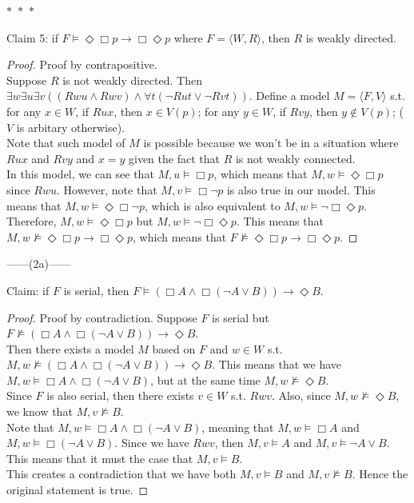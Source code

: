 \documentclass[12pt]{article}
\newcommand{\B}{\Box}
\newcommand{\D}{\Diamond}
\newcommand{\s}{\vDash}
\newcommand{\ns}{\nvDash}
\begin{document}
\noindent
\begin{center}
    $\ast$~$\ast$~$\ast$
\end{center}
Claim 5: if $F \vDash \D \B p \to \B \D p$ where $F = \langle W, R \rangle$, then $R$ is weakly directed. 
\begin{proof} Proof by contrapositive.\\
    Suppose $R$ is not weakly directed.
    Then $\exists w \exists u \exists v ((Rwu \land Rwv) \land \forall t(\neg Rut \lor \neg Rvt))$.
    Define a model $M  = \langle F, V \rangle$ s.t. for any $x \in W$, if $Rux$, then $x \in V(p)$; for any $y \in W$, if $Rvy$, then $y \notin V(p)$; ($V$ is arbitary otherwise).\\
    Note that such model of $M$ is possible because we won't be in a situation where $Rux$ and $Rvy$ and $x = y$ given the fact that $R$ is not weakly connected.\\
    In this model, we can see that $M, u \s \B p$, which means that $M, w \s \D \B p$ since $Rwu$.
    However, note that $M, v \s \B \neg p$ is also true in our model. 
    This means that $M, w \s \D \B \neg p$, which is also equivalent to $M, w \s \neg \B \D p$.\\
    Therefore, $M, w \s \D \B p$ but $M, w \s \neg \B \D p$.
    This means that $M, w \ns \D \B p \to \B \D p$, which means that $F \ns \D \B p \to \B \D p$.

\end{proof}

\newpage
\noindent
\begin{center}
    ------(2a)------
\end{center}
Claim: if $F$ is serial, then $F \s (\B A \land \B (\neg A \lor B)) \to \D B$.
\begin{proof} Proof by contradiction.
    Suppose $F$ is serial but $F \ns (\B A \land \B (\neg A \lor B)) \to \D B$.\\
    Then there exists a model $M$ based on $F$ and $w \in W$ s.t. $M, w \ns (\B A \land \B (\neg A \lor B)) \to \D B$.
    This means that we have $M, w \s \B A \land \B (\neg A \lor B)$, but at the same time $M, w \ns \D B$.\\
    Since $F$ is also serial, then there exists $v \in W$ s.t. $Rwv$. 
    Also, since $M, w \ns \D B$, we know that $M, v \ns B$.\\
    Note that $M, w \s \B A \land \B (\neg A \lor B)$, meaning that $M, w \s \B A$ and $M, w \s \B (\neg A \lor B)$. 
    Since we have $Rwv$, then $M, v \s A$ and $M, v \s \neg A \lor B$.
    This means that it must the case that $M, v \s B$.\\
    This creates a contradiction that we have both $M,v \s B$ and $M, v \ns B$.
    Hence the original statement is true.
\end{proof}
\end{document}
